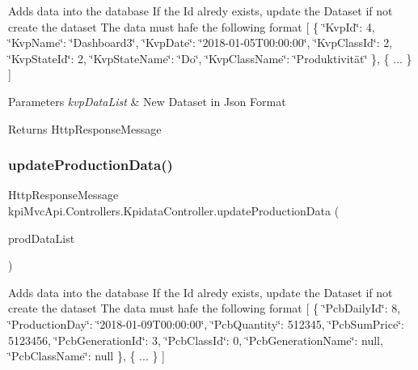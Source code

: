 Adds data into the database If the Id alredy exists, update the Dataset if not create the dataset The data must hafe the following format \mbox{[} \{ \char`\"{}\+Kvp\+Id\char`\"{}\+: 4, \char`\"{}\+Kvp\+Name\char`\"{}\+: \char`\"{}\+Dashboard3\char`\"{}, \char`\"{}\+Kvp\+Date\char`\"{}\+: \char`\"{}2018-\/01-\/05\+T00\+:00\+:00\char`\"{}, \char`\"{}\+Kvp\+Class\+Id\char`\"{}\+: 2, \char`\"{}\+Kvp\+State\+Id\char`\"{}\+: 2, \char`\"{}\+Kvp\+State\+Name\char`\"{}\+: \char`\"{}\+Do\char`\"{}, \char`\"{}\+Kvp\+Class\+Name\char`\"{}\+: \char`\"{}\+Produktivität\char`\"{} \}, \{ ... \} \mbox{]} 


\begin{DoxyParams}{Parameters}
{\em kvp\+Data\+List} & New Dataset in Json Format \\
\hline
\end{DoxyParams}
\begin{DoxyReturn}{Returns}
{\ttfamily Http\+Response\+Message} 
\end{DoxyReturn}
\mbox{\label{classkpi_mvc_api_1_1_controllers_1_1_kpidata_controller_a82f308e9ae4809dfdca3ce685af05774}} 
\subsubsection{\texorpdfstring{update\+Production\+Data()}{updateProductionData()}\hspace{0.1cm}{\footnotesize\ttfamily [1/2]}}
{\footnotesize\ttfamily Http\+Response\+Message kpi\+Mvc\+Api.\+Controllers.\+Kpidata\+Controller.\+update\+Production\+Data (\begin{DoxyParamCaption}\item[{List$<$ \hyperlink{classkpi_mvc_api_1_1_data_transfer_objects_1_1_production_data_dto}{Production\+Data\+Dto} $>$}]{prod\+Data\+List }\end{DoxyParamCaption})\hspace{0.3cm}{\ttfamily [inline]}}



Adds data into the database If the Id alredy exists, update the Dataset if not create the dataset The data must hafe the following format \mbox{[} \{ \char`\"{}\+Pcb\+Daily\+Id\char`\"{}\+: 8, \char`\"{}\+Production\+Day\char`\"{}\+: \char`\"{}2018-\/01-\/09\+T00\+:00\+:00\char`\"{}, \char`\"{}\+Pcb\+Quantity\char`\"{}\+: 512345, \char`\"{}\+Pcb\+Sum\+Price\char`\"{}\+: 5123456, \char`\"{}\+Pcb\+Generation\+Id\char`\"{}\+: 3, \char`\"{}\+Pcb\+Class\+Id\char`\"{}\+: 0, \char`\"{}\+Pcb\+Generation\+Name\char`\"{}\+: null, \char`\"{}\+Pcb\+Class\+Name\char`\"{}\+: null \}, \{ ... \} \mbox{]} 


